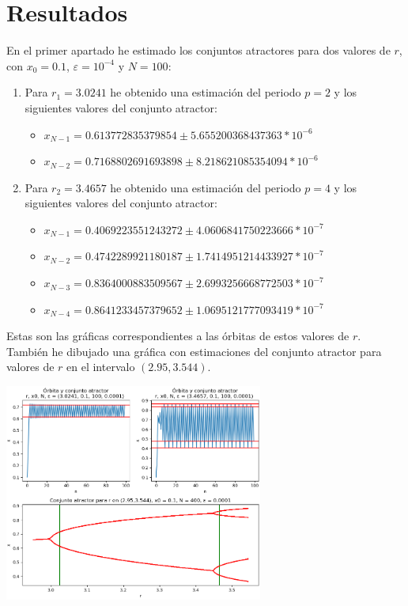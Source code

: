 \documentclass[10pt, spanish]{article}
\theoremstyle{definition}
\theoremstyle{break}
\begin{document}
\section{Resultados}

En el primer apartado he estimado los conjuntos atractores para dos valores de
$r$, con $x_0=0.1$, $\varepsilon = 10^{-4}$ y $N=100$:
\begin{enumerate}
    \item Para $r_1=3.0241$ he obtenido una estimación del periodo $p=2$ y los
        siguientes valores del conjunto atractor:
        \begin{itemize}
            \item $x_{N-1}=0.613772835379854 \pm5.655200368437363*10^{-6}$ 
            \item $x_{N-2}=0.7168802691693898 \pm8.218621085354094*10^{-6}$ 
        \end{itemize}
    \item Para $r_2=3.4657$ he obtenido una estimación del periodo $p=4$ y los
        siguientes valores del conjunto atractor:
        \begin{itemize}
            \item $x_{N-1} = 0.4069223551243272 \pm4.0606841750223666*10^{-7}$
            \item $x_{N-2} = 0.4742289921180187 \pm1.7414951214433927*10^{-7}$
            \item $x_{N-3} = 0.8364000883509567 \pm2.6993256668772503*10^{-7}$
            \item $x_{N-4} = 0.8641233457379652 \pm1.0695121777093419*10^{-7}$
        \end{itemize}
\end{enumerate}

Estas son las gráficas correspondientes a las órbitas de estos valores de $r$.
También he dibujado una gráfica con estimaciones del conjunto atractor para
valores de $r$ en el intervalo $(2.95, 3.544)$.

\begin{center}
\includegraphics[width=8.5cm]{plot01}
\end{center}
\end{document}
